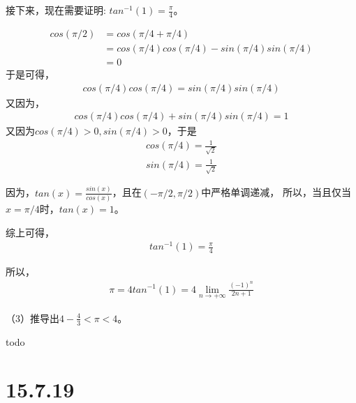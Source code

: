 \documentclass{article}
\begin{document}
接下来，现在需要证明: $tan^{-1}(1) = \frac{\pi}{4}$。

\begin{align*}
  cos(\pi/2) & = cos(\pi/4 + \pi/4)                          \\
             & = cos(\pi/4)cos(\pi/4) - sin(\pi/4)sin(\pi/4) \\
             & = 0
\end{align*}
于是可得，
\begin{align*}
  cos(\pi/4)cos(\pi/4) = sin(\pi/4)sin(\pi/4)
\end{align*}
又因为，
\begin{align*}
  cos(\pi/4)cos(\pi/4) + sin(\pi/4)sin(\pi/4) = 1
\end{align*}
又因为$cos(\pi/4) > 0, sin(\pi/4) > 0$，于是
\begin{align*}
  cos(\pi/4) = \frac{1}{\sqrt{2}} \\
  sin(\pi/4) = \frac{1}{\sqrt{2}}
\end{align*}

因为，$tan(x) = \frac{sin(x)}{cos(x)}$，且在$(-\pi/2, \pi/2)$中严格单调递减，
所以，当且仅当$x = \pi/4$时，$tan(x) = 1$。

综上可得，
\begin{align*}
  tan^{-1}(1) = \frac{\pi}{4}
\end{align*}

所以，
\begin{align*}
  \pi = 4tan^{-1}(1) = 4\lim\limits_{n \to +\infty} \frac{(-1)^n}{2n + 1}
\end{align*}

（3）推导出$4 - \frac{4}{3} < \pi < 4$。

todo

\section*{15.7.19}
\end{document}
